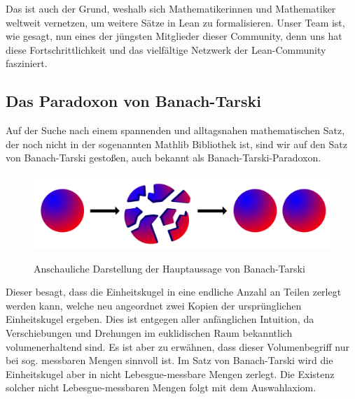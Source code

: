 \documentclass[10pt]{article}
\begin{document}

\noindent Das ist auch der Grund, weshalb sich Mathematikerinnen und Mathematiker weltweit vernetzen, um weitere Sätze in Lean zu formalisieren. Unser Team ist, wie gesagt, nun eines der jüngsten Mitglieder dieser Community, denn uns hat diese Fortschrittlichkeit und das vielfältige Netzwerk der Lean-Community fasziniert. \\

\subsection{Das Paradoxon von Banach-Tarski}\label{1.3}
Auf der Suche nach einem spannenden und alltagsnahen mathematischen Satz, der noch nicht in der sogenannten Mathlib Bibliothek ist, sind wir auf den Satz von Banach-Tarski gestoßen, auch bekannt als Banach-Tarski-Paradoxon. %
\vspace*{-0.8cm}
\begin{figure}[H]
    \centering
    \includegraphics[scale=0.15]{Bild Banach Tarski.png}
    \label{Abb2}
    \caption{Anschauliche Darstellung der Hauptaussage von Banach-Tarski \cite{Q11} }
    
\end{figure}
\vspace{-0.2cm}
\noindent Dieser besagt, dass die Einheitskugel in eine endliche Anzahl an Teilen zerlegt werden kann, welche neu angeordnet zwei Kopien der ursprünglichen Einheitskugel ergeben. Dies ist entgegen aller anfänglichen Intuition, da Verschiebungen und Drehungen im euklidischen Raum bekanntlich volumenerhaltend sind. Es ist aber zu erwähnen, dass dieser Volumenbegriff nur bei sog. messbaren Mengen sinnvoll ist. Im Satz von Banach-Tarski wird die Einheitskugel aber in nicht Lebesgue-messbare Mengen zerlegt. Die Existenz solcher nicht Lebesgue-messbaren Mengen folgt mit dem Auswahlaxiom.
\end{document}
